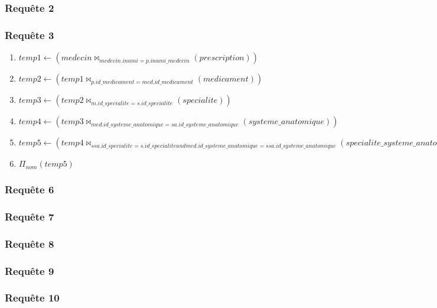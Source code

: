 \documentclass[utf8]{article}
\begin{document}
\subsubsection{Requête 2}

\subsubsection{Requête 3}
\begin{enumerate}
  \item $temp1 \leftarrow   (medecin \bowtie_{medecin.inami = p.inami\_medecin} (prescription))$
  \item $temp2 \leftarrow (temp1 \bowtie_{p.id\_medicament = med.id\_medicament}(medicament))$
  \item $temp3 \leftarrow (temp2 \bowtie_{m.id\_specialite = s.id\_specialite}(specialite))$
  \item $temp4 \leftarrow (temp3 \bowtie_{med.id\_systeme\_anatomique = sa.id\_systeme\_anatomique}(systeme\_anatomique))$
  \item $temp5 \leftarrow (temp4 \bowtie_{ssa.id\_specialite = s.id\_specialite and med.id\_systeme\_anatomique = ssa.id\_systeme\_anatomique}(specialite\_systeme\_anatomique))$
  \item $\Pi_{nom} (temp 5)$
\end{enumerate}

\subsubsection{Requête 6}
\subsubsection{Requête 7}
\subsubsection{Requête 8}
\subsubsection{Requête 9}
\subsubsection{Requête 10}

\section{}
\end{document}

